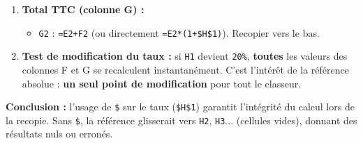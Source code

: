 \documentclass[11pt]{article}
\begin{document}
\begin{exoresolu}
\begin{enumerate}
\begin{itemize}
\begin{align*}
        \texttt{F6} &= 5000 \times 0,1925 = 962,5
        \end{align*}
    \end{itemize}
    \item \textbf{Total TTC (colonne G) :}
    \begin{itemize}
        \item \texttt{G2} : \texttt{=E2+F2} (ou directement \texttt{=E2*(1+\$H\$1)}). Recopier vers le bas.
    \end{itemize}
    \item \textbf{Test de modification du taux :} si \texttt{H1} devient \texttt{20\%}, \textbf{toutes} les valeurs des colonnes F et G se recalculent instantanément. C'est l'intérêt de la référence absolue : \textbf{un seul point de modification} pour tout le classeur.
\end{enumerate}
\textbf{Conclusion :} l'usage de \texttt{\$} sur le taux (\texttt{\$H\$1}) garantit l'intégrité du calcul lors de la recopie. Sans \texttt{\$}, la référence glisserait vers \texttt{H2}, \texttt{H3}... (cellules vides), donnant des résultats nuls ou erronés.
\end{exoresolu}
\end{document}
